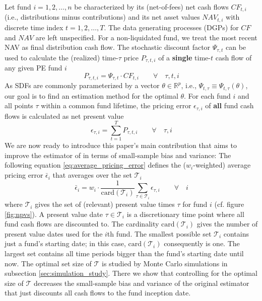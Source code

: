\documentclass[12pt]{article}
\begin{document}
Let fund $i=1,2,\dots,n$ be characterized by its (net-of-fees) net cash flows ${CF}_{t,i}$ (i.e., distributions minus contributions) and its net asset values ${NAV}_{t,i}$ with discrete time index $t=1,2,\dots,T$.
The data generating processes (DGPs) for $CF$ and $NAV$ are left unspecified.
For a non-liquidated fund, we treat the most recent NAV as final distribution cash flow.
The stochastic discount factor $\Psi_{\tau,t}$ can be used to calculate the (realized) time-$\tau$ price $P_{\tau,t,i}$ of a \textbf{single} time-$t$ cash flow of any given PE fund $i$
\begin{equation}
\label{eq:price}
P_{\tau,t,i} = \Psi_{\tau,t} \cdot CF_{t,i}
\qquad \forall \quad \tau,t,i
\end{equation}
As SDFs are commonly parameterized by a vector $\theta \in \mathbb{R}^{p}$, i.e., $\Psi_{t,\tau} \equiv \Psi_{t,\tau} (\theta)$, our goal is to find an estimation method for the optimal $\theta$.
For each fund $i$ and all points $\tau$ within a common fund lifetime, the pricing error $\epsilon_{\tau,i}$ of \textbf{all} fund cash flows is calculated as net present value
\begin{equation}
\label{eq:pricing_error}
\epsilon_{\tau,i} = \sum_{t=1}^T P_{\tau,t,i} 
\qquad \forall \quad \tau,i
\end{equation}
We are now ready to introduce this paper's main contribution that aims to improve the estimator of \cite{DLP12} in terms of small-sample bias and variance:
The following equation \ref{eq:average_pricing_error} defines the ($w_i$-weighted) average pricing error $\bar{\epsilon}_{i}$ that averages over the set $\mathcal{T}_i$
\begin{equation}
\label{eq:average_pricing_error}
\bar{\epsilon}_{i} =
w_{i} \cdot
\frac{1}{ \mathrm{card}(\mathcal{T}_{i}) }
\sum_{\tau \in \mathcal{T}_{i}}
\epsilon_{\tau,i}
\qquad \forall \quad i
\end{equation}
where $\mathcal{T}_i$ gives the set of (relevant) present value times $\tau$ for fund $i$ (cf. figure \ref{fig:npvs}).
A present value date $\tau \in \mathcal{T}_{i}$ is a discretionary time point where all fund cash flows are discounted to.
The cardinality $\mathrm{card}(\mathcal{T}_{i})$ gives the number of present value dates used for the $i$th fund.
The smallest possible set $\mathcal{T}_i$ contains just a fund's starting date; in this case, $\mathrm{card}(\mathcal{T}_{i})$ consequently is one.
The largest set contains all time periods bigger than the fund's starting date until now.
The optimal set size of $\mathcal{T}$ is studied by Monte Carlo simulations in subsection \ref{sec:simulation_study}.
There we show that controlling for the optimal size of $\mathcal{T}$ decreases the small-sample bias and variance of the original \cite{DLP12} estimator that just discounts all cash flows to the fund inception date.
\end{document}
